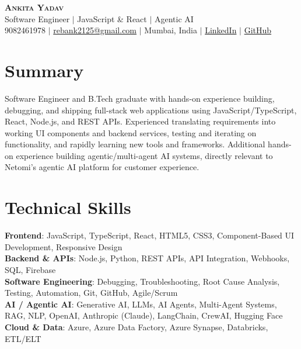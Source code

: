 \documentclass[letterpaper,10.5pt]{article}
\begin{document}
\begin{center}
    \textbf{\Huge \scshape Ankita Yadav} \\ \vspace{3pt}
    \small Software Engineer $|$ JavaScript \& React $|$ Agentic AI \\ \vspace{2pt}
    \small 9082461978 $|$ \href{mailto:rebank2125@gmail.com}{rebank2125@gmail.com} $|$ Mumbai, India $|$
    \href{https://www.linkedin.com/in/ankita-yadav-913923203}{LinkedIn} $|$ \href{https://github.com/rebeluni}{GitHub}
\end{center}

\section{Summary}
\small{Software Engineer and B.Tech graduate with hands-on experience building, debugging, and shipping full-stack web applications using JavaScript/TypeScript, React, Node.js, and REST APIs. Experienced translating requirements into working UI components and backend services, testing and iterating on functionality, and rapidly learning new tools and frameworks. Additional hands-on experience building agentic/multi-agent AI systems, directly relevant to Netomi's agentic AI platform for customer experience.}

\section{Technical Skills}
\begin{itemize}[leftmargin=0.15in, label={}]
    \small{\item{
     \textbf{Frontend}{: JavaScript, TypeScript, React, HTML5, CSS3, Component-Based UI Development, Responsive Design} \\
     \textbf{Backend \& APIs}{: Node.js, Python, REST APIs, API Integration, Webhooks, SQL, Firebase} \\
     \textbf{Software Engineering}{: Debugging, Troubleshooting, Root Cause Analysis, Testing, Automation, Git, GitHub, Agile/Scrum} \\
     \textbf{AI / Agentic AI}{: Generative AI, LLMs, AI Agents, Multi-Agent Systems, RAG, NLP, OpenAI, Anthropic (Claude), LangChain, CrewAI, Hugging Face} \\
     \textbf{Cloud \& Data}{: Azure, Azure Data Factory, Azure Synapse, Databricks, ETL/ELT}
    }}
\end{itemize}
\end{document}
